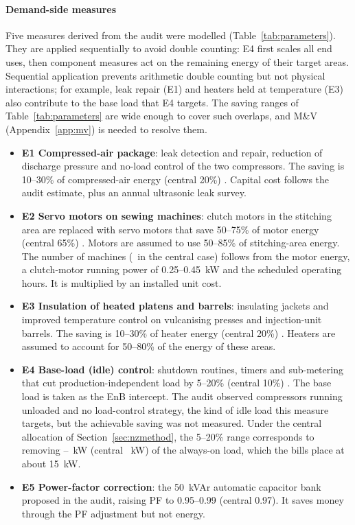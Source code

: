 \documentclass[preprint,12pt,authoryear]{elsarticle}
\begin{document}
\paragraph{Demand-side measures}
Five measures derived from the audit were modelled (Table~\ref{tab:parameters}). They are applied sequentially to avoid double counting: E4 first scales all end uses, then component measures act on the remaining energy of their target areas. Sequential application prevents arithmetic double counting but not physical interactions; for example, leak repair (E1) and heaters held at temperature (E3) also contribute to the base load that E4 targets. The saving ranges of Table~\ref{tab:parameters} are wide enough to cover such overlaps, and M\&V (Appendix~\ref{app:mv}) is needed to resolve them.
\begin{itemize}
\item \textbf{E1 Compressed-air package}: leak detection and repair, reduction of discharge pressure and no-load control of the two compressors. The saving is 10--30\% of compressed-air energy (central 20\%) \citep{doe2016compressed}. Capital cost follows the audit estimate, plus an annual ultrasonic leak survey.
\item \textbf{E2 Servo motors on sewing machines}: clutch motors in the stitching area are replaced with servo motors that save 50--75\% of motor energy (central 65\%) \citep{nemesa2023}. Motors are assumed to use 50--85\% of stitching-area energy. The number of machines (\nNSewing\ in the central case) follows from the motor energy, a clutch-motor running power of 0.25--0.45~kW and the scheduled operating hours. It is multiplied by an installed unit cost.
\item \textbf{E3 Insulation of heated platens and barrels}: insulating jackets and improved temperature control on vulcanising presses and injection-unit barrels. The saving is 10--30\% of heater energy (central 20\%) \citep{kent2018}. Heaters are assumed to account for 50--80\% of the energy of these areas.
\item \textbf{E4 Base-load (idle) control}: shutdown routines, timers and sub-metering that cut production-independent load by 5--20\% (central 10\%) \citep{mouzon2007,kara2011}. The base load is taken as the EnB intercept. The audit observed compressors running unloaded and no load-control strategy, the kind of idle load this measure targets, but the achievable saving was not measured. Under the central allocation of Section~\ref{sec:nzmethod}, the 5--20\% range corresponds to removing \nEFourKWLo--\nEFourKWHi~kW (central \nEFourKW~kW) of the always-on load, which the bills place at about 15~kW.
\item \textbf{E5 Power-factor correction}: the 50~kVAr automatic capacitor bank proposed in the audit, raising PF to 0.95--0.99 (central 0.97). It saves money through the PF adjustment but not energy.
\end{itemize}
\end{document}
